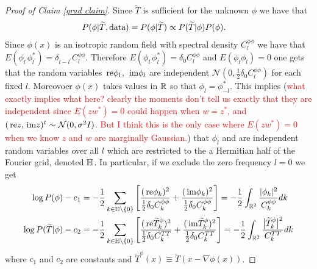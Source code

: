 \documentclass[noinfoline]{imsart}
\newcommand{\re}{\text{\,\rm re}}
\newcommand{\im}{\text{\,\rm im}}
\begin{document}
\begin{proof}[{ Proof of Claim \ref{grad claim}}]
Since $\tilde T$ is sufficient for the unknown $\phi$ we have that 
\begin{align*}
P(\phi|\widetilde T, \text{\rm data}) &= P(\phi|\widetilde T)\propto P(\widetilde T|\phi)P(\phi).
\end{align*}
Since $\phi(x)$ is an isotropic random field with spectral density $C_l^{\phi\phi}$ we have that $E(\phi^{\phantom{*}}_l \phi_{l^\prime}^*) = \delta_{l - l^\prime}C_l^{\phi\phi}$. 
Therefore  $E(\phi_l^{\phantom{*}}\phi_l^*) = \delta_{0}C_l^{\phi\phi}$ and $E(\phi_l\phi_{l}) = 0$ one gets that the random variables $\re \phi_l$, $\im \phi_l$ are independent $\mathcal N(0, \frac{1}{2}\delta_0 C_l^{\phi\phi})$ for each fixed $l$.
Moreovoer  $\phi(x)$ takes values in $\Bbb R$ so that  $\phi_l = \phi_{-l}^*$.  This implies (\textcolor{red}{what exactly implies what here? clearly the moments don't tell us exactly that they are independent since $E(z w^*)=0$ could happen when $w = z^*$, and $(\re z, \im z)^t\sim \mathcal N(0,\sigma^2 I)$. But I think this is the only case where $E(zw^*)=0$ when we know $z$ and $w$ are marginally Gaussian.}) that $\phi_l$ and are independent random variables over all $l$ which are restricted to the a Hermitian half of the Fourier grid, denoted $\Bbb H$. In particular,  if we exclude the zero frequency $l = 0$ we get
\begin{align}
\log P(\phi) - c_1 &=  - \frac{1}{2}\sum_{k \in \Bbb H\setminus \{0 \}}  \left[\frac{(\re \phi_k)^2}{\frac{1}{2}\delta_0 C_k^{\phi\phi}} +  \frac{(\im \phi_k)^2}{\frac{1}{2}\delta_0 C_k^{\phi\phi}} \right] = - \frac{1}{2}\int_{\Bbb R^2} \frac{|\phi_k|^2}{C_k^{\phi\phi}} dk \label{dr1} \\
\log P(\widetilde T| \phi) - c_2 &=  - \frac{1}{2}\sum_{k \in \Bbb H\setminus \{0 \}}  \left[\frac{(\re \widetilde T_k^\phi)^2}{\frac{1}{2}\delta_0 C_k^{TT}} +  \frac{(\im \widetilde T_k^\phi)^2}{\frac{1}{2}\delta_0 C_k^{TT}} \right] = - \frac{1}{2}\int_{\Bbb R^2} \frac{\bigl|\widetilde T_k^\phi\bigr|^2}{C_k^{TT}} dk \label{dr2}
\end{align}
where $c_1$ and $c_2$ are constants and  $\widetilde T^\phi(x)\equiv \widetilde T(x-\nabla \phi(x))$.

\end{proof}
\end{document}
